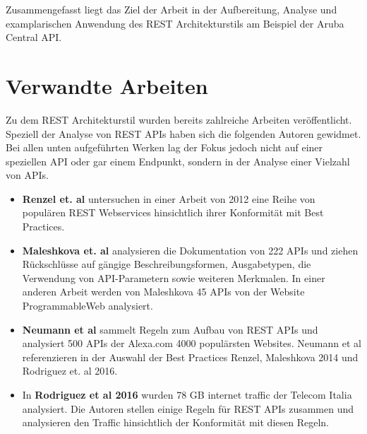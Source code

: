 Zusammengefasst liegt das Ziel der Arbeit in der Aufbereitung, Analyse und examplarischen Anwendung des REST Architekturstils am Beispiel der Aruba Central API.

\section{Verwandte Arbeiten}

Zu dem REST Architekturstil wurden bereits zahlreiche Arbeiten veröffentlicht. Speziell der Analyse von REST APIs haben sich die folgenden Autoren gewidmet. Bei allen unten aufgeführten Werken lag der Fokus jedoch nicht auf einer speziellen API oder gar einem Endpunkt, sondern in der Analyse einer Vielzahl von APIs.

\begin{itemize}
    \item \textbf{Renzel et. al} untersuchen in einer Arbeit von 2012 eine Reihe von populären REST Webservices hinsichtlich ihrer Konformität mit Best Practices.

    \item \textbf{Maleshkova et. al} analysieren die Dokumentation von 222 APIs und ziehen Rückschlüsse auf gängige Beschreibungsformen, Ausgabetypen, die Verwendung von API-Parametern sowie weiteren Merkmalen. In einer anderen Arbeit werden von Maleshkova 45 APIs von der Website ProgrammableWeb analysiert. 

    \item \textbf{Neumann et al} sammelt Regeln zum Aufbau von REST APIs und analysiert 500 APIs der Alexa.com 4000 populärsten Websites. Neumann et al referenzieren in der Auswahl der Best Practices Renzel, Maleshkova 2014 und Rodriguez et. al 2016.

    \item In \textbf{Rodriguez et al 2016} wurden 78 GB internet traffic der Telecom Italia analysiert. Die Autoren stellen einige Regeln für REST APIs zusammen und analysieren den Traffic hinsichtlich der Konformität mit diesen Regeln. 

\end{itemize}
